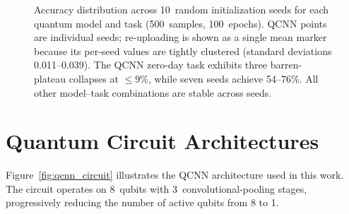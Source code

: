 \documentclass[twoside,openany,a4paper,11pt,english]{report}
\begin{document}
\begin{figure}[ht]
\caption{Accuracy distribution across 10~random initialization seeds for each quantum model and task (500~samples, 100~epochs). QCNN points are individual seeds; re-uploading is shown as a single mean marker because its per-seed values are tightly clustered (standard deviations 0.011--0.039). The QCNN zero-day task exhibits three barren-plateau collapses at $\leq 9\%$, while seven seeds achieve 54--76\%. All other model--task combinations are stable across seeds.}
\label{fig:seed_box}
\end{figure}


\section{Quantum Circuit Architectures}
\label{app:circuits}

Figure~\ref{fig:qcnn_circuit} illustrates the QCNN architecture used in this work. The circuit operates on 8~qubits with 3~convolutional-pooling stages, progressively reducing the number of active qubits from 8 to 1.
\end{document}
